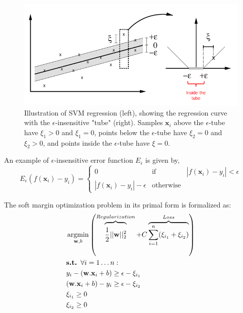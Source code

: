 \begin{figure}[h!]
\centering
\includegraphics[width=0.9\linewidth]{images/SVR_tube}
\caption{Illustration of SVM regression (left), showing the regression curve with the $\epsilon$-insensitive "tube" (right). Samples $\textbf{x}_i$ above the $\epsilon$-tube have $\xi_1 > 0$ and $\xi_1 = 0$, points below the $\epsilon$-tube have $\xi_2 = 0$ and $\xi_2 > 0$, and points inside the $\epsilon$-tube have $\xi = 0$.}
\label{fig:SVR_tube}
\end{figure}

\noindent An example of $\epsilon$-insensitive error function $E_{\epsilon}$ is given by,
\begin{equation}
E_{\epsilon} (f(\textbf{x}_i)-y_i) =
\left\lbrace
\begin{array}{lll}
0  								& \mbox{if} 		& |f(\textbf{x}_i)-y_i| < \epsilon\\
|f(\textbf{x}_i)-y_i|-\epsilon 	& \mbox{otherwise}  & 
\end{array}\right.
\end{equation}


\noindent The soft margin optimization problem in its primal form is formalized as:
	\begin{align}
		& \argmin_{\textbf{w},b}  \left( 
		\overbrace{\vphantom{\sum_{i=1}^n \xi_i}
			\frac{1}{2}||\textbf{w}||^2_2}^{Regularization}
		+ C \overbrace{\sum\limits_{i=1}^{n}(\xi_{i_1}+\xi_{i_2})}^{Loss}
		\right) 
		\label{eq:objectiveSVR}\\
		& \textbf{s.t. } \forall i=1 \ldots n:\\
		& y_i-(\textbf{w}.\textbf{x}_i+b) \geq \epsilon -\xi_{i_1} \\
		& (\textbf{w}.\textbf{x}_i+b)-y_i \geq \epsilon -\xi_{i_2} \\
		&  \xi_{i_1} \geq 0 \\
		&  \xi_{i_2} \geq 0 \\
	\end{align}

